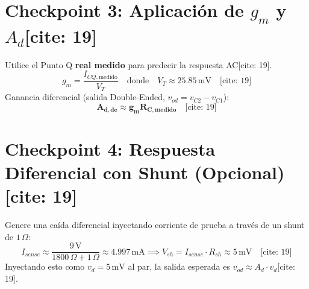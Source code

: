 \documentclass[11pt, a4paper]{article}
\begin{document}
\section*{Checkpoint 3: Aplicación de $g_m$ y $A_d$[cite: 19]}
Utilice el Punto Q \textbf{real medido} para predecir la respuesta AC[cite: 19].
\begin{equation*}
    g_m = \frac{I_{CQ,\text{medido}}}{V_T} \quad \text{donde} \quad V_T \approx 25.85\,\text{mV} \quad \text{[cite: 19]}
\end{equation*}
Ganancia diferencial (salida Double-Ended, $v_{od} = v_{C2} - v_{C1}$):
\begin{equation*}
    \mathbf{A_{d,de} \approx g_m R_{C,\text{medido}}} \quad \text{[cite: 19]}
\end{equation*}

\section*{Checkpoint 4: Respuesta Diferencial con Shunt (Opcional)[cite: 19]}
Genere una caída diferencial inyectando corriente de prueba a través de un shunt de $1\,\Omega$:
\begin{equation*}
    I_{sense} \approx \frac{9\,\text{V}}{1800\,\Omega + 1\,\Omega} \approx 4.997\,\text{mA} \implies V_{sh} = I_{sense} \cdot R_{sh} \approx 5\,\text{mV} \quad \text{[cite: 19]}
\end{equation*}
Inyectando esto como $v_d = 5\,\text{mV}$ al par, la salida esperada es $v_{od} \approx A_d \cdot v_d$[cite: 19].
\end{document}
